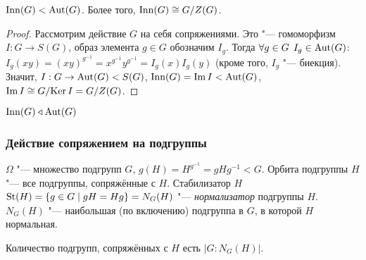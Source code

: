 \documentclass[main]{subfiles}
\begin{document}
\begin{proposition}
  $\operatorname{Inn}(G) < \operatorname{Aut}(G)$. Более того, $\Inn(G) \cong \Factor{G}[Z(G)]$.
\end{proposition}
\begin{proof}
  Рассмотрим действие $G$ на себя сопряжениями. Это "--- гомоморфизм
  $I : G \to S(G)$, образ элемента $g \in G$ обозначим $I_g$.
  Тогда $\forall {g \in G} \; \, I_g \in \operatorname{Aut}(G)$: $I_g(xy) = (xy)^{g^{-1}}
  = x^{g^{-1}} y^{g^{-1}} = I_g(x) I_g(y)$
  (кроме того, $I_g$ "--- биекция).
  Значит, $I : G \to \operatorname{Aut}(G) < S(G)$,
  $\operatorname{Inn}(G) = \operatorname{Im} I < \operatorname{Aut}(G)$,
  $\Img I \cong \Factor{G}[\Ker I] = \Factor{G}[Z(G)]$.
\end{proof}

\begin{exercise}
  \( \operatorname{Inn}(G) \triangleleft \operatorname{Aut}(G) \)
\end{exercise}

\subsubsection{Действие сопряжением на подгруппы}
\( \Omega \) "--- множество подгрупп \( G \),
$g(H) = H^{g^{-1}} = g H g^{-1} < G$.
Орбита подгруппы $H$ "---
все подгруппы, сопряжённые с $H$.
Стабилизатор $H$ $\operatorname{St}(H) = \{ g \in G \mid gH = Hg \} = N_G(H)$ "---
\emph{нормализатор} подгруппы $H$.
$N_G(H)$ "--- наибольшая (по включению) подгруппа в $G$,
в которой $H$ нормальная.

\begin{remark}
Количество подгрупп, сопряжённых с $H$ есть $|G:N_G(H)|$.
\end{remark}
\end{document}
